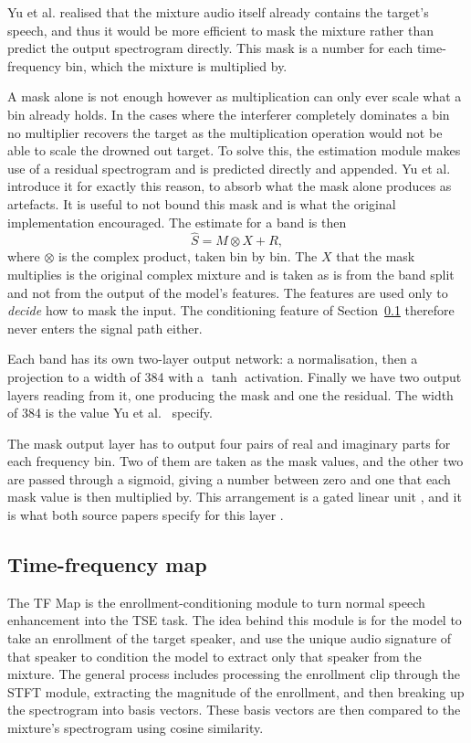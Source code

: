 Yu et al. realised that the mixture audio itself already contains the target's speech, and thus it would be more efficient to mask the mixture rather than predict the output spectrogram directly. This mask is a number for each time-frequency bin, which the mixture is multiplied by.

A mask alone is not enough however as multiplication can only ever scale what a bin already holds. In the cases where  the interferer completely dominates a bin no multiplier recovers the target as the multiplication operation would not be able to scale the drowned out target. To solve this, the estimation module makes use of a residual spectrogram and is predicted directly and appended. Yu et al.\ \cite{yu2023high} introduce it for exactly this reason, to absorb what the mask alone produces as artefacts. It is useful to not bound this mask and is what the original implementation encouraged. The estimate for a band is then
\begin{equation}
\hat{S} = M \otimes X + R,
\label{eq:estimator}
\end{equation}
where $\otimes$ is the complex product, taken bin by bin. The $X$ that the mask multiplies is the
original complex mixture and is taken as is from the band split and not from the output of the model's features. The features are used only to \emph{decide} how to mask the input. The conditioning feature of Section~\ref{sec:tfmap} therefore never enters the signal path either.

Each band has its own two-layer output network: a normalisation, then a projection to a width of 384 with a $\tanh$ activation. Finally we have two output layers reading from it, one producing the mask and one the residual. The width of 384 is the value Yu et al.\ \cite{yu2023high} specify.

The mask output layer has to output four pairs of real and imaginary parts for each frequency bin. Two of them are taken as the mask values, and the other two are passed through a sigmoid, giving a number between zero and one that each mask value is then multiplied by. This arrangement is a gated linear unit \cite{dauphin2017language}, and it is what both source papers specify for this layer \cite{luo2023music, yu2023high}.

\subsection{Time-frequency map}
\label{sec:tfmap}
The TF Map is the enrollment-conditioning module to turn normal speech enhancement into the TSE task. The idea behind this module is for the model to take an enrollment of the target speaker, and use the unique audio signature of that speaker to condition the model to extract only that speaker from the mixture. The general process includes processing the enrollment clip through the STFT module, extracting the magnitude of the enrollment, and then breaking up the spectrogram into basis vectors. These basis vectors are then compared to the mixture's spectrogram using cosine similarity.

